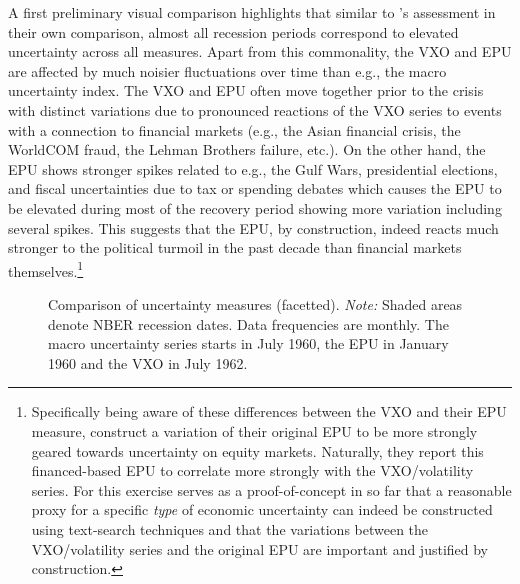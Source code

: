 \documentclass[a4paper,11pt,listof=nochaptergap,oneside,pointednumbers,bibtotoc,bigheadings,liststotoc,hidelinks]{scrbook}
\theoremstyle{mysatz}
\theoremstyle{mydefinition}
\theoremstyle{mytheorem}
\theoremstyle{mybemerkung}
\begin{document}
A first preliminary visual comparison highlights that similar to \citet{bachmannetal:13}'s assessment in their own comparison, almost all recession periods correspond to elevated uncertainty across all measures. Apart from this commonality, the VXO and EPU are affected by much noisier fluctuations over time than e.g., the macro uncertainty index. The VXO and EPU often move together prior to the crisis with distinct variations due to pronounced reactions of the VXO series to events with a connection to financial markets (e.g., the Asian financial crisis, the WorldCOM fraud, the Lehman Brothers failure, etc.). On the other hand, the EPU shows stronger spikes related to e.g., the Gulf Wars, presidential elections, and fiscal uncertainties due to tax or spending debates which causes the EPU to be elevated during most of the recovery period showing more variation including several spikes. This suggests that the EPU, by construction, indeed reacts much stronger to the political turmoil in the past decade than financial markets themselves.\footnote{Specifically being aware of these differences between the VXO and their EPU measure, \citet{bakeretal:15} construct a variation of their original EPU to be more strongly geared towards uncertainty on equity markets. Naturally, they report this financed-based EPU to correlate more strongly with the VXO/volatility series. For \citet{bakeretal:15} this exercise serves as a proof-of-concept in so far that a reasonable proxy for a specific \textit{type} of economic uncertainty can indeed be constructed using text-search techniques and that the variations between the VXO/volatility series and the original EPU are important and justified by construction.} 

\begin{figure}[!ht]
   \centering
   \setlength\fboxsep{0pt}
   \setlength\fboxrule{0pt}
      \caption[Comparison of uncertainty measures (facetted).]{Comparison of uncertainty measures (facetted).
      \textit{Note:} Shaded areas denote NBER recession dates. Data frequencies are monthly. The macro uncertainty series starts in July 1960, the EPU in January 1960 and the VXO in July 1962.}   \label{fig:comparison_plot}
\end{figure}
\end{document}
